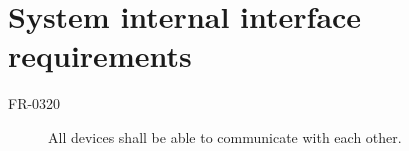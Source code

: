 \section{System internal interface requirements}

\begin{description}
  \item[FR-0320] All devices shall be able to communicate with each other.
\end{description}